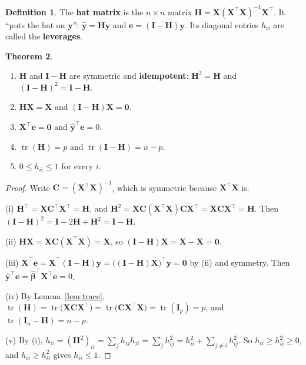 \documentclass[11pt,a4paper]{article}
\numberwithin{equation}{section}
\theoremstyle{definition}
\newtheorem{thm}{Theorem}[subsection]
\newtheorem{defn}[thm]{Definition}
\begin{document}
\begin{defn}
The \textbf{hat matrix} is the $n \times n$ matrix
$\mathbf{H} = \mathbf{X}(\mathbf{X}^\top\mathbf{X})^{-1}\mathbf{X}^\top$. It ``puts the hat on
$\mathbf{y}$'': $\hat{\mathbf{y}} = \mathbf{Hy}$ and $\mathbf{e} = (\mathbf{I} - \mathbf{H})\mathbf{y}$.
Its diagonal entries $h_{ii}$ are called the \textbf{leverages}.
\end{defn}

\begin{thm}\label{thm:hat}
\begin{enumerate}[label=(\roman*)]
\item $\mathbf{H}$ and $\mathbf{I} - \mathbf{H}$ are symmetric and \textbf{idempotent}:
$\mathbf{H}^2 = \mathbf{H}$ and $(\mathbf{I} - \mathbf{H})^2 = \mathbf{I} - \mathbf{H}$.
\item $\mathbf{HX} = \mathbf{X}$ and $(\mathbf{I} - \mathbf{H})\mathbf{X} = \mathbf{0}$.
\item $\mathbf{X}^\top\mathbf{e} = \mathbf{0}$ and $\hat{\mathbf{y}}^\top\mathbf{e} = 0$.
\item $\operatorname{tr}(\mathbf{H}) = p$ and $\operatorname{tr}(\mathbf{I} - \mathbf{H}) = n - p$.
\item $0 \le h_{ii} \le 1$ for every $i$.
\end{enumerate}
\end{thm}

\begin{proof}
Write $\mathbf{C} = (\mathbf{X}^\top\mathbf{X})^{-1}$, which is symmetric because
$\mathbf{X}^\top\mathbf{X}$ is.

(i) $\mathbf{H}^\top = \mathbf{X}\mathbf{C}^\top\mathbf{X}^\top = \mathbf{H}$, and
$\mathbf{H}^2 = \mathbf{X}\mathbf{C}(\mathbf{X}^\top\mathbf{X})\mathbf{C}\mathbf{X}^\top = \mathbf{X}\mathbf{C}\mathbf{X}^\top = \mathbf{H}$.
Then $(\mathbf{I} - \mathbf{H})^2 = \mathbf{I} - 2\mathbf{H} + \mathbf{H}^2 = \mathbf{I} - \mathbf{H}$.

(ii) $\mathbf{HX} = \mathbf{X}\mathbf{C}(\mathbf{X}^\top\mathbf{X}) = \mathbf{X}$, so
$(\mathbf{I} - \mathbf{H})\mathbf{X} = \mathbf{X} - \mathbf{X} = \mathbf{0}$.

(iii) $\mathbf{X}^\top\mathbf{e} = \mathbf{X}^\top(\mathbf{I} - \mathbf{H})\mathbf{y} = \bigl((\mathbf{I} - \mathbf{H})\mathbf{X}\bigr)^\top\mathbf{y} = \mathbf{0}$
by (ii) and symmetry. Then $\hat{\mathbf{y}}^\top\mathbf{e} = \hat{\boldsymbol\beta}^\top\mathbf{X}^\top\mathbf{e} = 0$.

(iv) By Lemma~\ref{lem:trace},
$\operatorname{tr}(\mathbf{H}) = \operatorname{tr}\bigl(\mathbf{X}\mathbf{C}\mathbf{X}^\top\bigr) = \operatorname{tr}\bigl(\mathbf{C}\mathbf{X}^\top\mathbf{X}\bigr) = \operatorname{tr}(\mathbf{I}_p) = p$,
and $\operatorname{tr}(\mathbf{I}_n - \mathbf{H}) = n - p$.

(v) By (i), $h_{ii} = (\mathbf{H}^2)_{ii} = \sum_j h_{ij}h_{ji} = \sum_j h_{ij}^2 = h_{ii}^2 + \sum_{j \neq i} h_{ij}^2$.
So $h_{ii} \ge h_{ii}^2 \ge 0$, and $h_{ii} \ge h_{ii}^2$ gives $h_{ii} \le 1$.
\end{proof}
\end{document}
